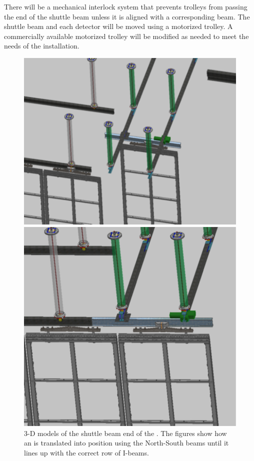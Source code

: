 There will be a mechanical interlock system that prevents trolleys
from passing the end of the shuttle beam unless it is aligned with a
corresponding  beam.  The shuttle beam and each detector will be
moved using a motorized trolley.  A commercially available motorized
trolley will be modified as needed to meet the needs of the
installation.
\begin{figure}[htbp]
\begin{center}
\begin{minipage}[c]{0.49\textwidth}
\includegraphics[width=\textwidth]{far-detector-single-phase/figures/Shuttle-1.pdf}
\end{minipage}
\begin{minipage}[c]{0.42\textwidth}
\includegraphics[width=\textwidth]{far-detector-single-phase/figures/shuttle-2.pdf}
\end{minipage}
\caption{3-D models of the shuttle beam end of the . The figures show how an 
is translated into position using the North-South beams until it lines up with the correct
row of I-beams.}
\label{shuttle}
\end{center}
\end{figure}

